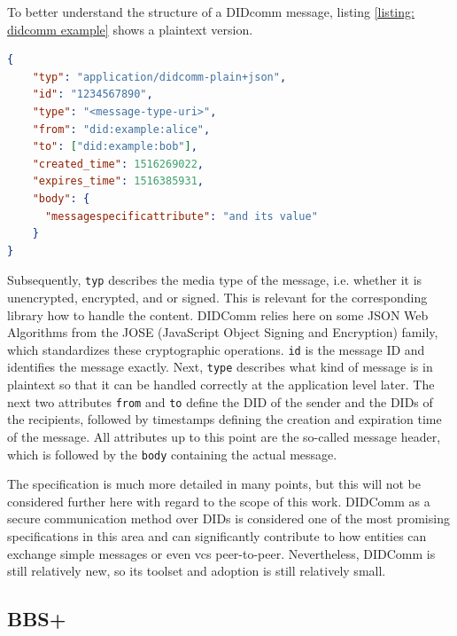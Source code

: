 		To better understand the structure of a DIDcomm message, listing \ref{listing: didcomm example} shows a plaintext version.
		\newline
		
		\begin{lstlisting}[language=json, caption={[Plaintext DIDComm message]Plaintext DIDComm message (extracted from \cite{hardman_didcomm_2021})}, captionpos=b, label={listing: didcomm example}]  
{
    "typ": "application/didcomm-plain+json",
    "id": "1234567890",
    "type": "<message-type-uri>",
    "from": "did:example:alice",
    "to": ["did:example:bob"],
    "created_time": 1516269022,
    "expires_time": 1516385931,
    "body": {
      "messagespecificattribute": "and its value"
    }
}\end{lstlisting}

        Subsequently, \texttt{typ} describes the media type of the message, i.e. whether it is unencrypted, encrypted, and or signed. This is relevant for the corresponding library how to handle the content. DIDComm relies here on some JSON Web Algorithms from the JOSE (JavaScript Object Signing and Encryption) family, which standardizes these cryptographic operations. \texttt{id} is the message ID and identifies the message exactly. Next, \texttt{type} describes what kind of message is in plaintext so that it can be handled correctly at the application level later. The next two attributes \texttt{from} and \texttt{to} define the \ac{DID} of the sender and the \acp{DID} of the recipients, followed by timestamps defining the creation and expiration time of the message. All attributes up to this point are the so-called message header, which is followed by the \texttt{body} containing the actual message. \cite{hardman_didcomm_2021}
        
        The specification is much more detailed in many points, but this will not be considered further here with regard to the scope of this work. DIDComm as a secure communication method over \acp{DID} is considered one of the most promising specifications in this area \cite[p. 97]{preukschat_self-sovereign_2021} and can significantly contribute to how entities can exchange simple messages or even \acp{vc} peer-to-peer. Nevertheless, DIDComm is still relatively new, so its toolset and adoption is still relatively small.
		
		\subsection{BBS+}\label{subsection: bbs}
		
